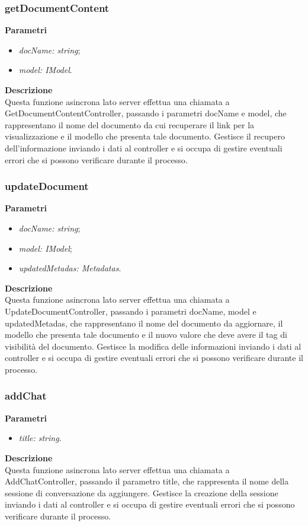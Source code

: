 \subsubsection{getDocumentContent}
\textbf{Parametri}
\begin{itemize}[itemsep=-4pt]
    \item \textit{docName: string};
    \item \textit{model: IModel}.
\end{itemize}
\textbf{Descrizione}\\
Questa funzione asincrona lato server effettua una chiamata a GetDocumentContentController, passando i parametri docName e model, che rappresentano il nome del documento da cui recuperare il link per la visualizzazione e il modello che presenta tale documento. Gestisce il recupero dell'informazione inviando i dati al controller e si occupa di gestire eventuali errori che si possono verificare durante il processo.

\subsubsection{updateDocument}
\textbf{Parametri}
\begin{itemize}[itemsep=-4pt]
    \item \textit{docName: string};
    \item \textit{model: IModel};
    \item \textit{updatedMetadas: Metadatas}.
\end{itemize}
\textbf{Descrizione}\\
Questa funzione asincrona lato server effettua una chiamata a UpdateDocumentController, passando i parametri docName, model e updatedMetadas, che rappresentano il nome del documento da aggiornare, il modello che presenta tale documento e il nuovo valore che deve avere il tag di visibilità del documento. Gestisce la modifica delle informazioni inviando i dati al controller e si occupa di gestire eventuali errori che si possono verificare durante il processo.

\subsubsection{addChat}
\textbf{Parametri}
\begin{itemize}
    \item \textit{title: string}.
\end{itemize}
\textbf{Descrizione}\\
Questa funzione asincrona lato server effettua una chiamata a AddChatController, passando il parametro title, che rappresenta il nome della sessione di conversazione da aggiungere. Gestisce la creazione della sessione inviando i dati al controller e si occupa di gestire eventuali errori che si possono verificare durante il processo.

